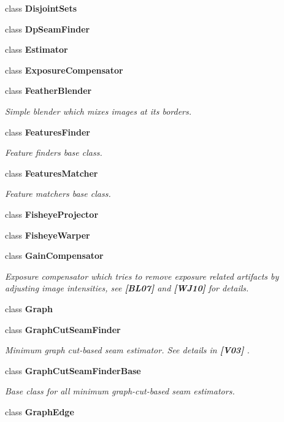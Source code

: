 \begin{DoxyCompactItemize}
class {\bfseries Disjoint\+Sets}
\item 
class {\bfseries Dp\+Seam\+Finder}
\item 
class {\bfseries Estimator}
\item 
class {\bfseries Exposure\+Compensator}
\item 
class {\bfseries Feather\+Blender}
\begin{DoxyCompactList}\small\item\em Simple blender which mixes images at its borders. \end{DoxyCompactList}\item 
class {\bfseries Features\+Finder}
\begin{DoxyCompactList}\small\item\em Feature finders base class. \end{DoxyCompactList}\item 
class {\bfseries Features\+Matcher}
\begin{DoxyCompactList}\small\item\em Feature matchers base class. \end{DoxyCompactList}\item 
class {\bfseries Fisheye\+Projector}
\item 
class {\bfseries Fisheye\+Warper}
\item 
class {\bfseries Gain\+Compensator}
\begin{DoxyCompactList}\small\item\em Exposure compensator which tries to remove exposure related artifacts by adjusting image intensities, see {\bfseries [B\+L07]} and {\bfseries [W\+J10]} for details. \end{DoxyCompactList}\item 
class {\bfseries Graph}
\item 
class {\bfseries Graph\+Cut\+Seam\+Finder}
\begin{DoxyCompactList}\small\item\em Minimum graph cut-\/based seam estimator. See details in {\bfseries [V03]} . \end{DoxyCompactList}\item 
class {\bfseries Graph\+Cut\+Seam\+Finder\+Base}
\begin{DoxyCompactList}\small\item\em Base class for all minimum graph-\/cut-\/based seam estimators. \end{DoxyCompactList}\item 
class {\bfseries Graph\+Edge}
\item 

\end{DoxyCompactItemize}
